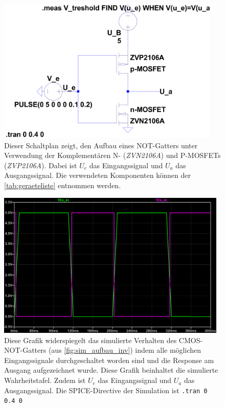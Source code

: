 \documentclass[12pt,english,ngerman]{scrartcl}
\begin{document}
\begin{figure}[H]
  \centering
    \includegraphics[width=0.95\textwidth]{./simdaten_lab/cmos/inverter/schaltung.png}
    \caption{Dieser Schaltplan zeigt, den Aufbau eines NOT-Gatters unter
    Verwendung der Komplementären N- (\textit{ZVN2106A}) und P-MOSFETs
    (\textit{ZVP2106A}). Dabei ist $U_e$ das Eingangssignal und $U_a$ das Ausgangssignal.
    Die verwendeten Komponenten können der \autoref{tab:geraeteliste} entnommen werden.
  }
  \label{fig:sim_aufbau_inv}
\end{figure}


\begin{figure}[H]
  \centering
  \includegraphics[width=\linewidth, height=7cm]{./simdaten_lab/cmos/inverter/kennlinie_einaus.png}
  \caption{Diese Grafik widerspiegelt das simulierte Verhalten des CMOS-NOT-Gatters (aus
    \autoref{fig:sim_aufbau_inv}) indem alle möglichen Eingangssignale
    durchgeschaltet worden sind und die Response am Ausgang aufgezeichnet
    wurde. Diese Grafik beinhaltet die simulierte Wahrheitstafel. Zudem ist
    $U_e$ das Eingangssignal und $U_a$ das Ausgangssignal. Die SPICE-Directive
    der Simulation ist \texttt{.tran 0 0.4 0}}
  \label{fig:sim_inv_wahrheit}
\end{figure}
\end{document}
